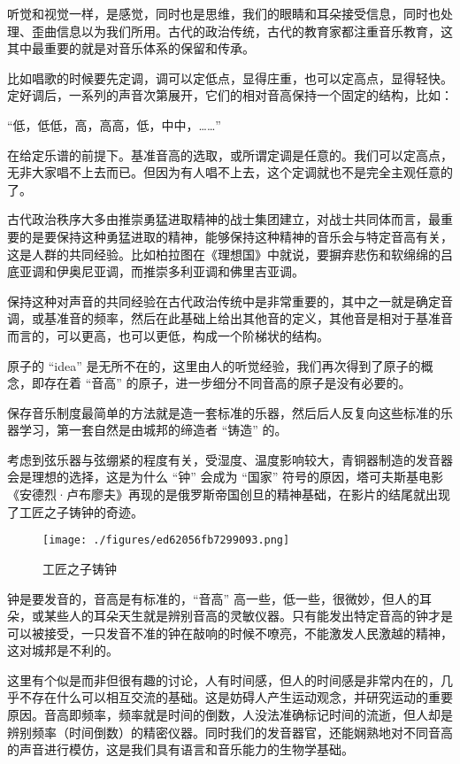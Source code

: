 听觉和视觉一样，是感觉，同时也是思维，我们的眼睛和耳朵接受信息，同时也处理、歪曲信息以为我们所用。古代的政治传统，古代的教育家都注重音乐教育，这其中最重要的就是对音乐体系的保留和传承。

比如唱歌的时候要先定调，调可以定低点，显得庄重，也可以定高点，显得轻快。定好调后，一系列的声音次第展开，它们的相对音高保持一个固定的结构，比如：

“低，低低，高，高高，低，中中，……”

在给定乐谱的前提下。基准音高的选取，或所谓定调是任意的。我们可以定高点，无非大家唱不上去而已。但因为有人唱不上去，这个定调就也不是完全主观任意的了。

古代政治秩序大多由推崇勇猛进取精神的战士集团建立，对战士共同体而言，最重要的是要保持这种勇猛进取的精神，能够保持这种精神的音乐会与特定音高有关，这是人群的共同经验。比如柏拉图在《理想国》中就说，要摒弃悲伤和软绵绵的吕底亚调和伊奥尼亚调，而推崇多利亚调和佛里吉亚调。

保持这种对声音的共同经验在古代政治传统中是非常重要的，其中之一就是确定音调，或基准音的频率，然后在此基础上给出其他音的定义，其他音是相对于基准音而言的，可以更高，也可以更低，构成一个阶梯状的结构。

原子的 “idea” 是无所不在的，这里由人的听觉经验，我们再次得到了原子的概念，即存在着 “音高” 的原子，进一步细分不同音高的原子是没有必要的。

保存音乐制度最简单的方法就是造一套标准的乐器，然后后人反复向这些标准的乐器学习，第一套自然是由城邦的缔造者 “铸造” 的。

考虑到弦乐器与弦绷紧的程度有关，受湿度、温度影响较大，青铜器制造的发音器会是理想的选择，这是为什么 “钟” 会成为 “国家” 符号的原因，塔可夫斯基电影《安德烈·卢布廖夫》再现的是俄罗斯帝国创旦的精神基础，在影片的结尾就出现了工匠之子铸钟的奇迹。

\begin{figure}[ht]
\centering
\texttt{[image: ./figures/ed62056fb7299093.png]}
\caption{工匠之子铸钟} \label{fig_ClBohr_1}
\end{figure}


钟是要发音的，音高是有标准的，“音高” 高一些，低一些，很微妙，但人的耳朵，或某些人的耳朵天生就是辨别音高的灵敏仪器。只有能发出特定音高的钟才是可以被接受，一只发音不准的钟在敲响的时候不嘹亮，不能激发人民激越的精神，这对城邦是不利的。

这里有个似是而非但很有趣的讨论，人有时间感，但人的时间感是非常内在的，几乎不存在什么可以相互交流的基础。这是妨碍人产生运动观念，并研究运动的重要原因。音高即频率，频率就是时间的倒数，人没法准确标记时间的流逝，但人却是辨别频率（时间倒数）的精密仪器。同时我们的发音器官，还能娴熟地对不同音高的声音进行模仿，这是我们具有语言和音乐能力的生物学基础。

